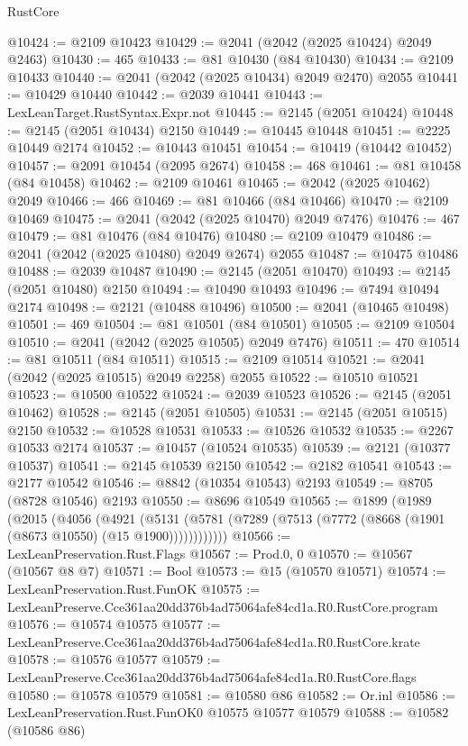 \begin{lexlean}{RustCore}
\begin{coremodule}
@10424 := @2109 @10423
@10429 := @2041 (@2042 (@2025 @10424) @2049 @2463)
@10430 := 465
@10433 := @81 @10430 (@84 @10430)
@10434 := @2109 @10433
@10440 := @2041 (@2042 (@2025 @10434) @2049 @2470) @2055
@10441 := @10429 @10440
@10442 := @2039 @10441
@10443 := LexLeanTarget.RustSyntax.Expr.not
@10445 := @2145 (@2051 @10424)
@10448 := @2145 (@2051 @10434) @2150
@10449 := @10445 @10448
@10451 := @2225 @10449 @2174
@10452 := @10443 @10451
@10454 := @10419 (@10442 @10452)
@10457 := @2091 @10454 (@2095 @2674)
@10458 := 468
@10461 := @81 @10458 (@84 @10458)
@10462 := @2109 @10461
@10465 := @2042 (@2025 @10462) @2049
@10466 := 466
@10469 := @81 @10466 (@84 @10466)
@10470 := @2109 @10469
@10475 := @2041 (@2042 (@2025 @10470) @2049 @7476)
@10476 := 467
@10479 := @81 @10476 (@84 @10476)
@10480 := @2109 @10479
@10486 := @2041 (@2042 (@2025 @10480) @2049 @2674) @2055
@10487 := @10475 @10486
@10488 := @2039 @10487
@10490 := @2145 (@2051 @10470)
@10493 := @2145 (@2051 @10480) @2150
@10494 := @10490 @10493
@10496 := @7494 @10494 @2174
@10498 := @2121 (@10488 @10496)
@10500 := @2041 (@10465 @10498)
@10501 := 469
@10504 := @81 @10501 (@84 @10501)
@10505 := @2109 @10504
@10510 := @2041 (@2042 (@2025 @10505) @2049 @7476)
@10511 := 470
@10514 := @81 @10511 (@84 @10511)
@10515 := @2109 @10514
@10521 := @2041 (@2042 (@2025 @10515) @2049 @2258) @2055
@10522 := @10510 @10521
@10523 := @10500 @10522
@10524 := @2039 @10523
@10526 := @2145 (@2051 @10462)
@10528 := @2145 (@2051 @10505)
@10531 := @2145 (@2051 @10515) @2150
@10532 := @10528 @10531
@10533 := @10526 @10532
@10535 := @2267 @10533 @2174
@10537 := @10457 (@10524 @10535)
@10539 := @2121 (@10377 @10537)
@10541 := @2145 @10539 @2150
@10542 := @2182 @10541
@10543 := @2177 @10542
@10546 := @8842 (@10354 @10543) @2193
@10549 := @8705 (@8728 @10546) @2193
@10550 := @8696 @10549
@10565 := @1899
    (@1989
      (@2015
        (@4056
          (@4921
            (@5131 (@5781 (@7289 (@7513 (@7772 (@8668 (@1901 (@8673 @10550) (@15 @1900))))))))))))
@10566 := LexLeanPreservation.Rust.Flags
@10567 := Prod.{0, 0}
@10570 := @10567 (@10567 @8 @7)
@10571 := Bool
@10573 := @15 (@10570 @10571)
@10574 := LexLeanPreservation.Rust.FunOK
@10575 := LexLeanPreserve.Cce361aa20dd376b4ad75064afe84cd1a.R0.RustCore.program
@10576 := @10574 @10575
@10577 := LexLeanPreserve.Cce361aa20dd376b4ad75064afe84cd1a.R0.RustCore.krate
@10578 := @10576 @10577
@10579 := LexLeanPreserve.Cce361aa20dd376b4ad75064afe84cd1a.R0.RustCore.flags
@10580 := @10578 @10579
@10581 := @10580 @86
@10582 := Or.inl
@10586 := LexLeanPreservation.Rust.FunOK0 @10575 @10577 @10579
@10588 := @10582 (@10586 @86)

\end{coremodule}
\end{lexlean}
